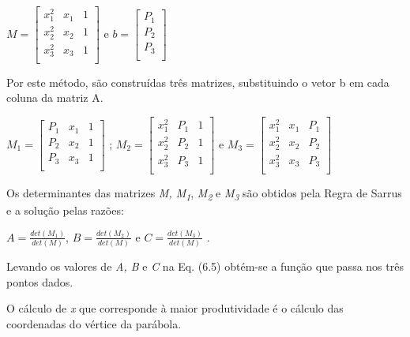  \( M= \left[ \begin{matrix}
x_{1}^{2}  &  x_{1}  &  1\\
x_{2}^{2}  &  x_{2}  &  1\\
x_{3}^{2}  &  x_{3}  &  1\\
\end{matrix}
 \right]  \)        e       \( b= \left[ \begin{matrix}
P_{1}\\
P_{2}\\
P_{3}\\
\end{matrix}
 \right]  \) 

Por este método, são construídas três matrizes, substituindo o vetor b em cada coluna da matriz A.

 \( M_{1}= \left[ \begin{matrix}
P_{1}  &  x_{1}  &  1\\
P_{2}  &  x_{2}  &  1\\
P_{3}  &  x_{3}  &  1\\
\end{matrix}
 \right]  \) ;             \( M_{2}= \left[ \begin{matrix}
x_{1}^{2}  &  P_{1}  &  1\\
x_{2}^{2}  &  P_{2}  &  1\\
x_{3}^{2}  &  P_{3}  &  1\\
\end{matrix}
 \right]  \)           e          \( M_{3}= \left[ \begin{matrix}
x_{1}^{2}  &  x_{1}  &  P_{1}\\
x_{2}^{2}  &  x_{2}  &  P_{2}\\
x_{3}^{2}  &  x_{3}  &  P_{3}\\
\end{matrix}
 \right]  \) 

Os determinantes das matrizes \textit{M, M\textsubscript{1}},  \textit{M\textsubscript{2}} e \textit{M\textsubscript{3}}  são obtidos pela Regra de Sarrus e a solução pelas razões:

 \( A=\frac{det \left( M_{1} \right) }{det \left( M \right) } \), \( B=\frac{det \left( M_{2} \right) }{det \left( M \right) } \) e \( C=\frac{det \left( M_{3} \right) }{det \left( M \right) } \) .

Levando os valores de \textit{A, B} e \textit{C} na Eq. (6.5) obtém-se a função que passa nos três pontos dados. 

O cálculo de \textit{x} que corresponde à maior produtividade é o cálculo das coordenadas do vértice da parábola.

